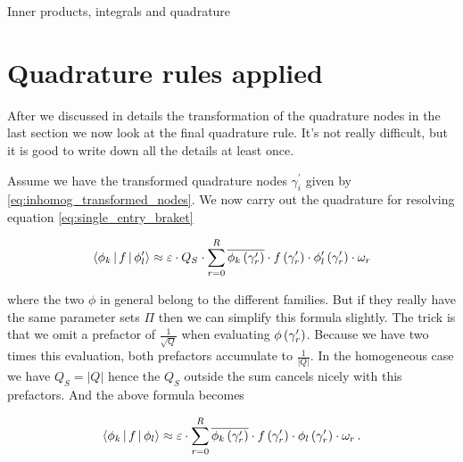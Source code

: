 \begin{chapter}{Inner products, integrals and quadrature}
%
%


\section{Quadrature rules applied}

After we discussed in details the transformation of the quadrature nodes in the
last section we now look at the final quadrature rule. It's not really difficult,
but it is good to write down all the details at least once.

Assume we have the transformed quadrature nodes $\gamma_i^\prime$ given by \eqref{eq:inhomog_transformed_nodes}.
We now carry out the quadrature for resolving equation \eqref{eq:single_entry_braket}

\begin{equation}
\begin{split}
  \Braket{\phi_k | f | \phi_l^\prime}
  \approx
  \varepsilon \cdot Q_S \cdot \sum_{r=0}^R \overline{\phi_k\left( \gamma_r^\prime \right)} \cdot f\left( \gamma_r^\prime \right) \cdot \phi_l^\prime\left( \gamma_r^\prime \right) \cdot \omega_r
\end{split}
\end{equation}

where the two $\phi$ in general belong to the different families. But if they really
have the same parameter sets $\Pi$ then we can simplify this formula slightly. The
trick is that we omit a prefactor of $\frac{1}{\sqrt{Q}}$ when evaluating $\phi\left( \gamma_r^\prime \right)$.
Because we have two times this evaluation, both prefactors accumulate to $\frac{1}{|Q|}$.
In the homogeneous case we have $Q_S = |Q|$ hence the $Q_S$ outside the sum
cancels nicely with this prefactors. And the above formula becomes

\begin{equation} \label{eq:homogeneous_quadrature_rule}
\begin{split}
  \Braket{\phi_k | f | \phi_l}
  \approx
  \varepsilon \cdot \sum_{r=0}^R \overline{\phi_k\left( \gamma_r^\prime \right)} \cdot f\left( \gamma_r^\prime \right) \cdot \phi_l\left( \gamma_r^\prime \right) \cdot \omega_r \,.
\end{split}
\end{equation}

\end{chapter}

